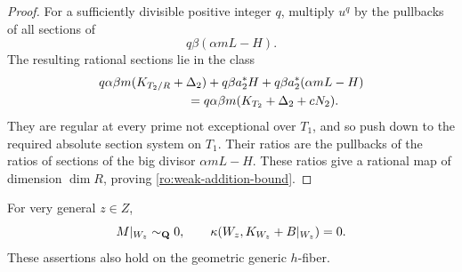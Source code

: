 \begin{proof}
For a sufficiently divisible positive integer $q$, multiply $u^q$ by
the pullbacks of all sections of
\[
 q\beta(\alpha mL-H).
\]
The resulting rational sections lie in the class
\begin{align*}
 &q\alpha\beta m(K_{T_2/R}+\Delta_2)
       +q\beta a_2^*H
       +q\beta a_2^*(\alpha mL-H)\\
 &\hspace{25mm}
   =q\alpha\beta m(K_{T_2}+\Delta_2+cN_2).
\end{align*}
They are regular at every prime not exceptional over $T_1$, and so
push down to the required absolute section system on $T_1$.  Their
ratios are the pullbacks of the ratios of sections of the big divisor
$\alpha mL-H$.  These ratios give a rational map of dimension
$\dim R$, proving \eqref{ro:weak-addition-bound}.
\end{proof}

\begin{proposition}
\label{ro:trivial}
For very general $z\in Z$,
\begin{equation}
 M|_{W_z}\sim_{\mathbf Q}0,
 \qquad
 \kappa(W_z,K_{W_z}+B|_{W_z})=0.
 \label{ro:trivial-identities}
\end{equation}
These assertions also hold on the geometric generic $h$-fiber.
\end{proposition}

